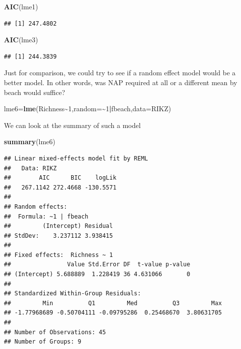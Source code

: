 \documentclass[
]{book}
\newenvironment{Shaded}{\begin{snugshade}}{\end{snugshade}}
\newcommand{\AttributeTok}[1]{\textcolor[rgb]{0.13,0.29,0.53}{#1}}
\newcommand{\DecValTok}[1]{\textcolor[rgb]{0.00,0.00,0.81}{#1}}
\newcommand{\FunctionTok}[1]{\textcolor[rgb]{0.13,0.29,0.53}{\textbf{#1}}}
\newcommand{\NormalTok}[1]{#1}
\newcommand{\OtherTok}[1]{\textcolor[rgb]{0.56,0.35,0.01}{#1}}
\newcommand{\SpecialCharTok}[1]{\textcolor[rgb]{0.81,0.36,0.00}{\textbf{#1}}}
\begin{document}
\begin{Shaded}
\begin{Highlighting}[]
\FunctionTok{AIC}\NormalTok{(lme1)}
\end{Highlighting}
\end{Shaded}

\begin{verbatim}
## [1] 247.4802
\end{verbatim}

\begin{Shaded}
\begin{Highlighting}[]
\FunctionTok{AIC}\NormalTok{(lme3)}
\end{Highlighting}
\end{Shaded}

\begin{verbatim}
## [1] 244.3839
\end{verbatim}

Just for comparison, we could try to see if a random effect model would be a better model. In other words, was NAP required at all or a different mean by beach would suffice?

\begin{Shaded}
\begin{Highlighting}[]
\NormalTok{lme6}\OtherTok{=}\FunctionTok{lme}\NormalTok{(Richness}\SpecialCharTok{\textasciitilde{}}\DecValTok{1}\NormalTok{,}\AttributeTok{random=}\SpecialCharTok{\textasciitilde{}}\DecValTok{1}\SpecialCharTok{|}\NormalTok{fbeach,}\AttributeTok{data=}\NormalTok{RIKZ)}
\end{Highlighting}
\end{Shaded}

We can look at the summary of such a model

\begin{Shaded}
\begin{Highlighting}[]
\FunctionTok{summary}\NormalTok{(lme6)}
\end{Highlighting}
\end{Shaded}

\begin{verbatim}
## Linear mixed-effects model fit by REML
##   Data: RIKZ 
##        AIC      BIC    logLik
##   267.1142 272.4668 -130.5571
## 
## Random effects:
##  Formula: ~1 | fbeach
##         (Intercept) Residual
## StdDev:    3.237112 3.938415
## 
## Fixed effects:  Richness ~ 1 
##                Value Std.Error DF  t-value p-value
## (Intercept) 5.688889  1.228419 36 4.631066       0
## 
## Standardized Within-Group Residuals:
##         Min          Q1         Med          Q3         Max 
## -1.77968689 -0.50704111 -0.09795286  0.25468670  3.80631705 
## 
## Number of Observations: 45
## Number of Groups: 9
\end{verbatim}
\end{document}
